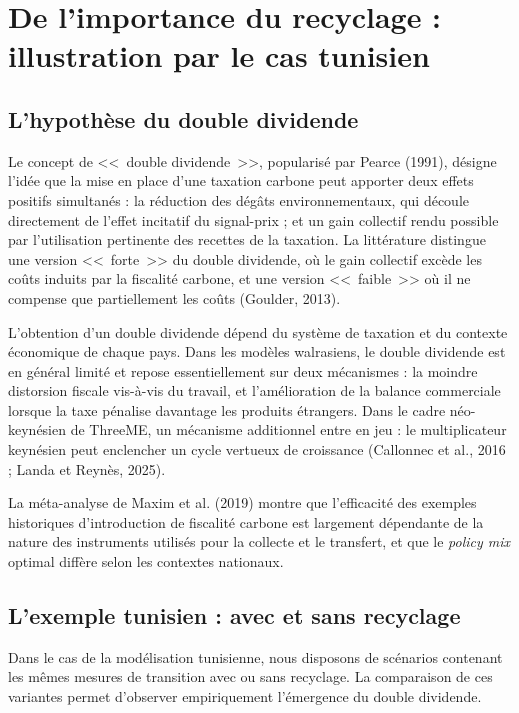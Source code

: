 \documentclass[12pt, a4paper]{article}
\begin{document}
\section{De l'importance du recyclage : illustration par le cas tunisien}
\label{sec:recyclage}

\subsection{L'hypothèse du double dividende}

Le concept de <<~double dividende~>>, popularisé par Pearce (1991), désigne l'idée que la mise en place d'une taxation carbone peut apporter deux effets positifs simultanés : la réduction des dégâts environnementaux, qui découle directement de l'effet incitatif du signal-prix ; et un gain collectif rendu possible par l'utilisation pertinente des recettes de la taxation. La littérature distingue une version <<~forte~>> du double dividende, où le gain collectif excède les coûts induits par la fiscalité carbone, et une version <<~faible~>> où il ne compense que partiellement les coûts (Goulder, 2013).

L'obtention d'un double dividende dépend du système de taxation et du contexte économique de chaque pays. Dans les modèles walrasiens, le double dividende est en général limité et repose essentiellement sur deux mécanismes : la moindre distorsion fiscale vis-à-vis du travail, et l'amélioration de la balance commerciale lorsque la taxe pénalise davantage les produits étrangers. Dans le cadre néo-keynésien de ThreeME, un mécanisme additionnel entre en jeu : le multiplicateur keynésien peut enclencher un cycle vertueux de croissance (Callonnec et al., 2016 ; Landa et Reynès, 2025).

La méta-analyse de Maxim et al. (2019) montre que l'efficacité des exemples historiques d'introduction de fiscalité carbone est largement dépendante de la nature des instruments utilisés pour la collecte et le transfert, et que le \textit{policy mix} optimal diffère selon les contextes nationaux.

\subsection{L'exemple tunisien : avec et sans recyclage}

Dans le cas de la modélisation tunisienne, nous disposons de scénarios contenant les mêmes mesures de transition avec ou sans recyclage. La comparaison de ces variantes permet d'observer empiriquement l'émergence du double dividende.
\end{document}
